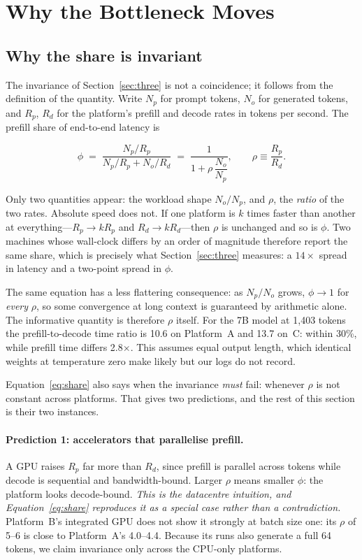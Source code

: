 \documentclass[sigconf,nonacm,10pt]{acmart}
\begin{document}
\section{Why the Bottleneck Moves}
\label{sec:why}

\subsection{Why the share is invariant}
\label{sec:invariance-analysis}

The invariance of Section~\ref{sec:three} is not a coincidence; it follows from the definition of the
quantity. Write $N_p$ for prompt tokens, $N_o$ for generated tokens, and $R_p$, $R_d$ for the platform's
prefill and decode rates in tokens per second. The prefill share of end-to-end latency is

\begin{equation}
\phi \;=\; \frac{N_p/R_p}{N_p/R_p + N_o/R_d}
      \;=\; \frac{1}{1 + \rho\,\dfrac{N_o}{N_p}},
\qquad \rho \equiv \frac{R_p}{R_d}.
\label{eq:share}
\end{equation}

Only two quantities appear: the workload shape $N_o/N_p$, and $\rho$, the \emph{ratio} of the two rates.
Absolute speed does not. If one platform is $k$ times faster than another at everything---$R_p \!\to\! kR_p$
and $R_d \!\to\! kR_d$---then $\rho$ is unchanged and so is $\phi$. Two machines whose wall-clock differs by
an order of magnitude therefore report the same share, which is precisely what
Section~\ref{sec:three} measures: a $14\times$ spread in latency and a two-point spread in $\phi$.

The same equation has a less flattering consequence: as $N_p/N_o$ grows, $\phi\to 1$ for \emph{every} $\rho$, so
some convergence at long context is guaranteed by arithmetic alone. The informative quantity is therefore $\rho$
itself. For the 7B model at 1{,}403 tokens the prefill-to-decode time ratio is 10.6 on Platform~A and 13.7 on~C:
within 30\%, while prefill time differs 2.8$\times$. This assumes equal output length, which identical weights at
temperature zero make likely but our logs do not record.

Equation~\ref{eq:share} also says when the invariance \emph{must} fail: whenever $\rho$ is not constant
across platforms. That gives two predictions, and the rest of this section is their two instances.

\paragraph{Prediction 1: accelerators that parallelise prefill.} A GPU raises $R_p$ far more than $R_d$,
since prefill is parallel across tokens while decode is sequential and bandwidth-bound. Larger $\rho$ means
smaller $\phi$: the platform looks decode-bound. \emph{This is the datacentre intuition, and
Equation~\ref{eq:share} reproduces it as a special case rather than a contradiction.} Platform~B's integrated
GPU does not show it strongly at batch size one: its $\rho$ of 5--6 is close to Platform~A's 4.0--4.4. Because
its runs also generate a full 64 tokens, we claim invariance only across the CPU-only platforms.
\end{document}
